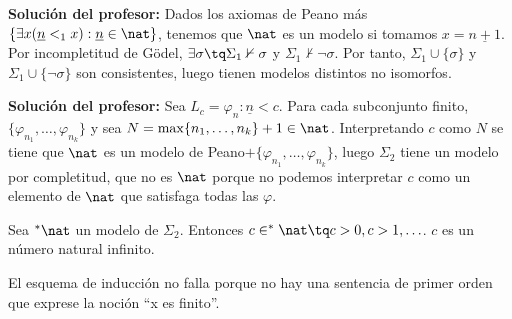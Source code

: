\begin{problem}
\textbf{Solución del profesor:}
Dados los axiomas de Peano más $\{\exists x (\underline{n}<_1 x): \underline{n}\in \nat \}$,
tenemos que $\nat$ es un modelo si tomamos $x = \underline{n+1}$. Por incompletitud de Gödel,
$\exists \sigma \tq \Sigma_1 \nvdash \sigma$ y $\Sigma_1 \nvdash \neg \sigma$. Por tanto, $\Sigma_1\cup\{\sigma\}$ y $\Sigma_1\cup \{\neg\sigma\}$ son consistentes, luego tienen modelos distintos no isomorfos.

\spart

%

\textbf{Solución del profesor:}
Sea $L_c = \varphi_n: \underline{n} < c$. Para cada subconjunto finito, $\{\varphi_{n_1}, \hdots, \varphi_{n_k}\}$ y sea $N = \max\{n_1, \hdots, n_k\}+1\in \nat$. Interpretando $c$ como $N$ se tiene que $\nat$ es un modelo de Peano$+\{\varphi_{n_1}, \hdots, \varphi_{n_k}\}$, luego $\Sigma_2$ tiene un modelo por completitud, que no es $\nat$ porque no podemos interpretar $c$ como un elemento de $\nat$ que satisfaga todas las $\varphi$.

Sea $^*\nat$ un modelo de $\Sigma_2$. Entonces $c\in ^*\nat \tq c>0, c>1, \hdots$.
$c$ es un número natural infinito.

El esquema de inducción no falla porque no hay una sentencia de primer orden que exprese la noción ``x es finito''.
\end{problem}
